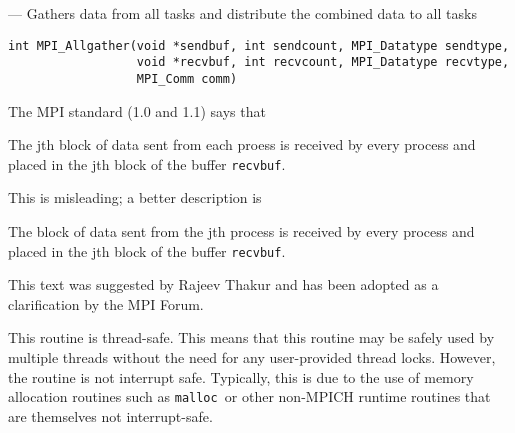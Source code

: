 \startmanpage
{}
--- Gathers data from all tasks and distribute the combined data to all tasks 
\startvb\begin{verbatim}
int MPI_Allgather(void *sendbuf, int sendcount, MPI_Datatype sendtype, 
                  void *recvbuf, int recvcount, MPI_Datatype recvtype, 
                  MPI_Comm comm)

\end{verbatim}
\endvb

\par
{}
\par
{}
The MPI standard (1.0 and 1.1) says that
\nextline
\par
\nextline
\par
The jth block of data sent from  each proess is received by every process
and placed in the jth block of the buffer {\tt recvbuf}.
\nextline
\par
\nextline
\par
This is misleading; a better description is
\nextline
\par
\nextline
\par
The block of data sent from the jth process is received by every
process and placed in the jth block of the buffer {\tt recvbuf}.
\nextline
\par
\nextline
\par
This text was suggested by Rajeev Thakur and has been adopted as a
clarification by the MPI Forum.
\par
{}
\par
This routine is thread-safe.  This means that this routine may be
safely used by multiple threads without the need for any user-provided
thread locks.  However, the routine is not interrupt safe.  Typically,
this is due to the use of memory allocation routines such as {\tt malloc
}or other non-MPICH runtime routines that are themselves not interrupt-safe.
\par
